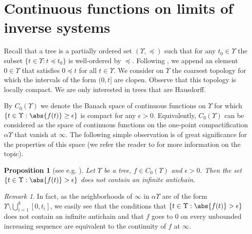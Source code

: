 \documentclass[11pt]{article}
\newtheorem{proposition}[theorem]{Proposition}
\theoremstyle{definition}
\theoremstyle{remark}
\newtheorem*{remark}{Remark}
\begin{document}

\section{Continuous functions on limits of inverse systems} \label{characterization}

Recall that a tree is a partially ordered set $(\Upsilon, \preceq)$ such that for any $t_0 \in \Upsilon$ the subset $\{t \in \Upsilon: t \preceq t_0\}$ is well-ordered by $\preceq$. Following \cite{haydon_trees}, we append an element $0 \in \Upsilon$ that satisfies $0 \preceq t$ for all $t \in \Upsilon$. We consider on $\Upsilon$ the coarsest topology for which the intervals of the form $(0,t]$ are clopen. Observe that this topology is locally compact. We are only interested in trees that are Hausdorff. 

By $C_0(\Upsilon)$ we denote the Banach space of continuous functions on $\Upsilon$ for which $\{t \in \Upsilon: \abs{f(t)} \geq \epsilon\}$ is compact for any $\epsilon >0$. Equivalently, $C_0(\Upsilon)$ can be considered as the space of continuous functions on the one-point compactification $\alpha \Upsilon$ that vanish at $\infty$. The following simple observation is of great significance for the properties of this space (we refer the reader to \cite{haydon_trees} for more information on the topic).

\begin{proposition}[see e.g. {\cite[Lemma 2.1]{haydon_trees}}] \label{finite_antichanains}
	Let $\Upsilon$ be a tree, $f \in C_0(\Upsilon)$ and $\epsilon >0$. Then the set $\{t \in \Upsilon: \abs{f(t)} > \epsilon\}$ does not contain an infinite antichain.
\end{proposition}

\begin{remark}
	In fact, as the neighborhoods of $\infty$ in $\alpha \Upsilon$ are of the form $\Upsilon \setminus \bigcup_{i = 1}^k [0, t_i]$, we easily see that the conditions that $\{t \in \Upsilon: \abs{f(t)} > \epsilon\}$ does not contain an infinite antichain and that $f$ goes to $0$ on every unbounded increasing sequence are equivalent to the continuity of $f$ at $\infty$.
\end{remark}
\end{document}
